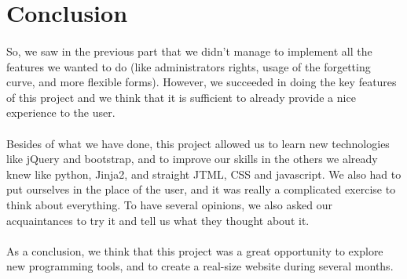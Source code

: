 \section{Conclusion} %

\paragraph{}

So, we saw in the previous part that we didn't manage to implement all the features we wanted to do (like administrators rights, usage of the forgetting curve, and more flexible forms). However, we succeeded in doing the key features of this project and we think that it is sufficient to already provide a nice experience to the user. 

\paragraph{}
Besides of what we have done, this project allowed us to learn new technologies like jQuery and bootstrap, and to improve our skills in the others we already knew like python, Jinja2, and straight JTML, CSS and javascript. We also had to put ourselves in the place of the user, and it was really a complicated exercise to think about everything. To have several opinions, we also asked our acquaintances to try it and tell us what they thought about it. 

\paragraph{}
As a conclusion, we think that this project was a great opportunity to explore new programming tools, and to create a real-size website during several months.